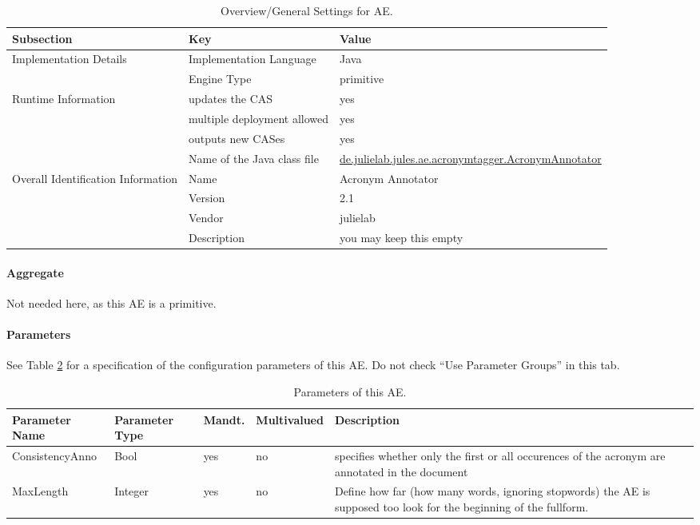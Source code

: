 \documentclass[11pt,a4paper,halfparskip]{scrartcl}
\begin{document}
\begin{table}[h!]
  \centering
  \begin{tabular}{|p{3.5cm}|p{4cm}|p{6cm}|}
    \hline
    Subsection & Key & Value \\
    \hline\hline
    Implementation Details & Implementation Language &  Java\\
    \cline{2-3}
    & Engine Type & primitive\\
    \hline
    Runtime Information & updates the CAS & yes \\
    \cline{2-3}
    & multiple deployment allowed & yes\\
    \cline{2-3}
    & outputs new CASes & yes \\
    \cline{2-3}
    & Name of the Java class file & \url{de.julielab.jules.ae.acronymtagger.AcronymAnnotator}\\
    \hline
    Overall Identification Information & Name & Acronym Annotator \\
    \cline{2-3}
    & Version &  2.1\\
    \cline{2-3}
    & Vendor & julielab\\
    \cline{2-3}
    & Description & you may keep this empty\\
    \hline
  \end{tabular}
  \caption{Overview/General Settings for AE.}
  \label{tab:overview}
\end{table}


\paragraph{Aggregate}
Not needed here, as this AE is a primitive.

\paragraph{Parameters}
\label{sss:parameters}

See Table \ref{tab:parameters} for a specification of the
configuration parameters of this AE. Do not check ``Use Parameter
Groups'' in this tab.


\begin{table}[ht!]
  \centering
  \begin{tabular}{|p{2.8cm}|p{1.8cm}|p{1.5cm}|p{1.5cm}|p{5cm}|}
    \hline
    Parameter Name & Parameter Type & Mandt. & Multi\-valued & Description \\
    \hline\hline
    ConsistencyAnno & Bool & yes & no & specifies whether only the first or all occurences of the acronym are annotated in the document\\
\hline
MaxLength & Integer &  yes & no & Define how far (how many words, ignoring stopwords) the AE is supposed too look for the beginning of the fullform.\\
    \hline
  \end{tabular}
  \caption{Parameters of this AE.}
  \label{tab:parameters}
\end{table}
\end{document}
